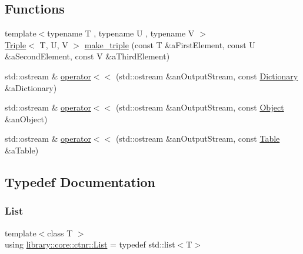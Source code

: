 \subsection*{Functions}
\begin{DoxyCompactItemize}
\item 
{\footnotesize template$<$typename T , typename U , typename V $>$ }\\\hyperlink{structlibrary_1_1core_1_1ctnr_1_1_triple}{Triple}$<$ T, U, V $>$ \hyperlink{namespacelibrary_1_1core_1_1ctnr_a96a0b941c0de59772cb5e073d0c2b8a8}{make\+\_\+triple} (const T \&a\+First\+Element, const U \&a\+Second\+Element, const V \&a\+Third\+Element)
\item 
std\+::ostream \& \hyperlink{namespacelibrary_1_1core_1_1ctnr_a5089e336819bf6e43bdb9ea9c8c01fcf}{operator$<$$<$} (std\+::ostream \&an\+Output\+Stream, const \hyperlink{classlibrary_1_1core_1_1ctnr_1_1_dictionary}{Dictionary} \&a\+Dictionary)
\item 
std\+::ostream \& \hyperlink{namespacelibrary_1_1core_1_1ctnr_a20ee48a4a564834bae30af868b549043}{operator$<$$<$} (std\+::ostream \&an\+Output\+Stream, const \hyperlink{classlibrary_1_1core_1_1ctnr_1_1_object}{Object} \&an\+Object)
\item 
std\+::ostream \& \hyperlink{namespacelibrary_1_1core_1_1ctnr_aae8e4f8665fde7fdd3e3f479e48c90aa}{operator$<$$<$} (std\+::ostream \&an\+Output\+Stream, const \hyperlink{classlibrary_1_1core_1_1ctnr_1_1_table}{Table} \&a\+Table)
\end{DoxyCompactItemize}


\subsection{Typedef Documentation}
\mbox{\label{namespacelibrary_1_1core_1_1ctnr_a87ccf40619002299b341a5e76e989912}} 
\subsubsection{\texorpdfstring{List}{List}}
{\footnotesize\ttfamily template$<$class T $>$ \\
using \hyperlink{namespacelibrary_1_1core_1_1ctnr_a87ccf40619002299b341a5e76e989912}{library\+::core\+::ctnr\+::\+List} = typedef std\+::list$<$T$>$}



